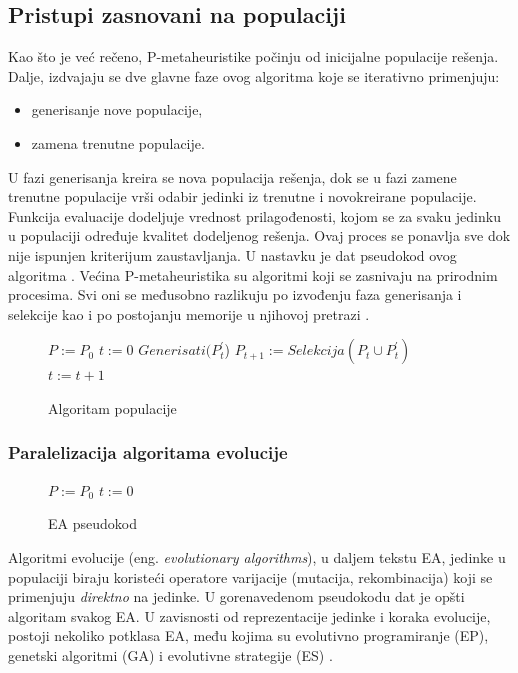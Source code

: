\documentclass[a4paper]{article}
\newenvironment{algoritam}[1][htb]
{\renewcommand{\algorithmcfname}{Algoritam}
\begin{figure}[ht]
\centering
  \begin{minipage}{.75\linewidth}
	\begin{algorithm}[#1]%
  }{\end{algorithm}
  \end{minipage}
\end{figure}}
\begin{document}
\subsection{Pristupi zasnovani na populaciji}
\label{sec:OsnovnoPopulacija} 
Kao što je već rečeno, P-metaheuristike počinju od inicijalne populacije rešenja. Dalje, izdvajaju se dve glavne faze ovog algoritma koje se iterativno primenjuju: \cite{talbi}
\begin{itemize}
	\item generisanje nove populacije,
	\item zamena trenutne populacije.
\end{itemize} 

U fazi generisanja kreira se nova populacija rešenja, dok se u fazi zamene trenutne populacije vrši odabir jedinki iz trenutne i novokreirane populacije. Funkcija evaluacije dodeljuje vrednost prilagođenosti, kojom se za svaku jedinku u populaciji određuje kvalitet dodeljenog rešenja.
Ovaj proces se ponavlja sve dok nije ispunjen kriterijum zaustavljanja. U nastavku je dat pseudokod ovog algoritma \cite{talbi}.
\newpage \indent Većina P-metaheuristika su algoritmi koji se zasnivaju na prirodnim procesima. Svi oni se međusobno razlikuju po izvođenju faza generisanja i selekcije kao i po postojanju memorije u njihovoj pretrazi \cite{talbi}.

\begin{algoritam}[H]
\SetAlgoLined
 $P := P_0$\;
 $t := 0$\;
 {
    $Generisati(P_t^{'}$)\; 
    $P_{t+1} := Selekcija(P_t  \cup  P_t^{'})$\;
    $t := t + 1$\;
 }
\caption{Algoritam populacije} 
\end{algoritam}

\subsubsection{Paralelizacija algoritama evolucije}
\label{sec:ParalelizacijaEvolucije}
\begin{algoritam}[H]
\SetAlgoLined
 $P := P_0$\;
 $t := 0$\;
\caption{EA pseudokod}
\end{algoritam}

Algoritmi evolucije (eng. \textit{evolutionary algorithms}), u daljem tekstu EA, jedinke u populaciji biraju koristeći operatore varijacije (mutacija, rekombinacija) koji se primenjuju \textit{direktno} na jedinke. U gorenavedenom pseudokodu dat je opšti algoritam svakog EA. U zavisnosti od reprezentacije jedinke i koraka evolucije, postoji nekoliko potklasa EA, među kojima su evolutivno programiranje (EP), genetski algoritmi (GA) i evolutivne strategije (ES) \cite{alba}.
\end{document}
